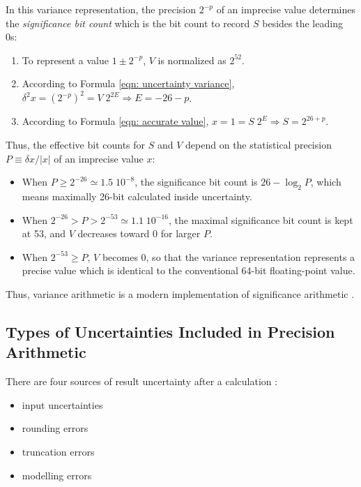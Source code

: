 \documentclass[twoside]{article}
\numberwithin{equation}{section}
\begin{document}
In this variance representation, the precision $2^{-p}$ of an imprecise value determines the \emph{significance bit count} which is the bit count to record $S$ besides the leading 0s:
\begin{enumerate}
\item To represent a value $1 \pm 2^{-p}$, $V$ is normalized as $2^{52}$.

\item According to Formula \eqref{eqn: uncertainty variance}, $\delta^2 x = (2^{-p})^2 = V \; 2^{2E} \Rightarrow E = -26 - p$.

\item According to Formula \eqref{eqn: accurate value}, $ x = 1 = S \; 2^E \Rightarrow S = 2^{26 + p}$.  
\end{enumerate}
Thus, the effective bit counts for $S$ and $V$ depend on the statistical precision $P \equiv \delta x / |x|$ of an imprecise value $x$:
\begin{itemize}
\item When $P \geq 2^{-26} \simeq 1.5\;10^{-8}$, the significance bit count is $26 - \log_{2} P$, which means maximally 26-bit calculated inside uncertainty.

\item When $2^{-26} > P > 2^{-53} \simeq 1.1\;10^{-16}$, the maximal significance bit count is kept at 53, and $V$ decreases toward 0 for larger $P$.

\item When $2^{-53} \geq P$, $V$ becomes 0, so that the variance representation represents a precise value which is identical to the conventional 64-bit floating-point value.
\end{itemize}
Thus, variance arithmetic is a modern implementation of significance arithmetic \cite{Significance_Arithmetic} \cite{Digital_Significance_Arithmetic} \cite{Unnormalized_Arithmetic}.




\subsection{Types of Uncertainties Included in Precision Arithmetic}

There are four sources of result uncertainty after a calculation \cite{Statistical_Methods}\cite{Numerical_Recipes}:
\begin{itemize}
\item input uncertainties
\item rounding errors
\item truncation errors
\item modelling errors
\end{itemize}
\end{document}
